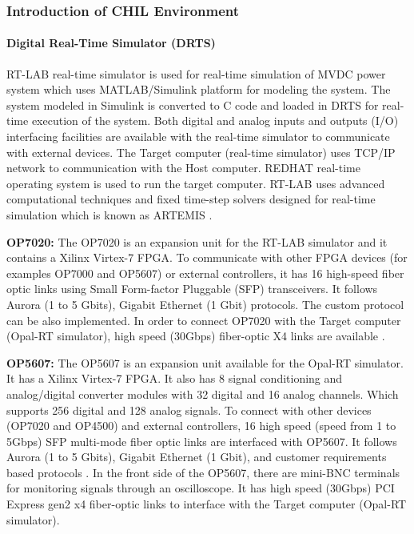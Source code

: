 \subsubsection{Introduction of CHIL Environment}
\paragraph{Digital Real-Time Simulator (DRTS)}
RT-LAB real-time simulator is used for real-time simulation of MVDC power system which uses MATLAB/Simulink platform for modeling the system. The system modeled in Simulink is converted to C code and loaded in DRTS for real-time execution of the system. Both digital and analog inputs and outputs (I/O) interfacing facilities are available with the real-time simulator to communicate with external devices. The Target computer (real-time simulator) uses TCP/IP network to communication with the Host computer. REDHAT real-time operating system is used to run the target computer. RT-LAB uses advanced computational techniques and fixed time-step solvers designed for                 real-time simulation which is known as ARTEMIS \cite{mikkili2015review}. 

   
{\textbf{OP7020: }}The OP7020 is an expansion unit for the RT-LAB simulator and it contains a Xilinx Virtex-7 FPGA. To communicate with other FPGA devices (for examples OP7000 and OP5607) or external controllers, it has 16 high-speed fiber optic links using Small Form-factor Pluggable (SFP) transceivers. It follows Aurora (1 to 5 Gbits), Gigabit Ethernet (1 Gbit) protocols. The custom protocol can be also implemented. In order to connect OP7020  with the Target computer (Opal-RT simulator), high speed (30Gbps) fiber-optic X4 links are available \cite{FPGA_EXP}. 


{\textbf{OP5607: }}The OP5607 is an expansion unit available for the Opal-RT simulator. It has a Xilinx Virtex-7 FPGA. It also has 8 signal conditioning and analog/digital converter modules with 32 digital and 16 analog channels. Which supports 256 digital and 128 analog signals. To connect with other devices (OP7020 and OP4500) and external controllers, 16 high speed (speed from 1 to 5Gbps) SFP multi-mode fiber optic links are interfaced with OP5607.  It follows Aurora (1 to 5 Gbits), Gigabit Ethernet (1 Gbit), and customer requirements based protocols \cite{FPGA_EXP}. In the front side of the OP5607, there are mini-BNC terminals for monitoring signals through an oscilloscope. It has high speed (30Gbps) PCI Express gen2 x4 fiber-optic links to interface with the Target computer (Opal-RT simulator). 


